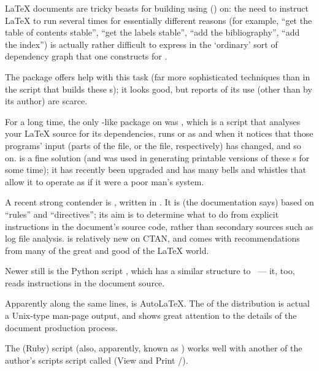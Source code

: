 
\LaTeX{} documents are tricky beasts for building using
()  on: the need to
instruct \LaTeX{} to run several times for essentially different
reasons (for example, ``get the table of contents stable'', ``get the
labels stable'', ``add the bibliography'', ``add the index'') is
actually rather difficult to express in the `ordinary' sort of
dependency graph that one constructs for .

The  package offers help with this task (far more
sophisticated techniques than in the script that builds these s); it
looks good, but reports of its use (other than by its author) are scarce.

For a long time, the only -like package on 
was , which is a 
script that analyses your \LaTeX{} source for its dependencies, runs
\BibTeX{} or  as and when it notices that those
programs' input (parts of the  file, or the
 file, respectively) has changed, and so on.
 is a fine 
solution (and was used in generating printable versions of these
s for some time); it has recently been upgraded and has
many bells and whistles that allow it to operate as if it were a poor
man's \WYSIWYG{} system.

A recent strong contender is , written in
.  It is (the documentation says) based on ``rules''
and ``directives''; its aim is to determine what to do from explicit
instructions in the document's source code, rather than secondary
sources such as log file analysis.   is relatively new
on CTAN, and comes with recommendations from many of the great and
good of the \LaTeX{} world.

Newer still is the Python script , which has a similar
structure to ~--- it, too, reads instructions in the
document source.

Apparently along the same lines, is Auto\LaTeX{}.  The 
of the distribution is actual a Unix-type man-page output, and shows
great attention to the details of the document production process.

The (Ruby) script  (also, apparently, known as
) works well with another of the author's
scripts script called  (View and Print
\PS{}/).


